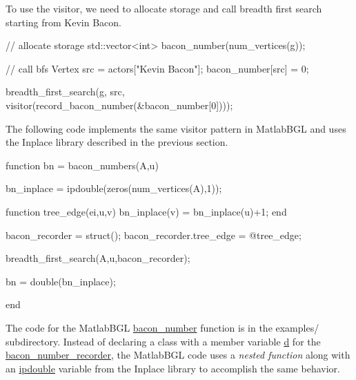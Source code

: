 \documentclass[12pt]{article}
\newcommand{\mycmd}[1]{\url{#1}}
\newcommand{\mypath}[1]{{\ttfamily \small #1}}
\begin{document}
To use the visitor, we need to allocate storage and call breadth first search starting from Kevin Bacon.

\begin{mcode}  
  // allocate storage
  std::vector<int> bacon_number(num_vertices(g));
  
  // call bfs
  Vertex src = actors["Kevin Bacon"];
  bacon_number[src] = 0;

  breadth_first_search(g, src, visitor(record_bacon_number(&bacon_number[0])));
\end{mcode}  

The following code implements the same visitor pattern in MatlabBGL and uses the Inplace library described in the previous section.

\begin{mcode}
function bn = bacon_numbers(A,u)
%

bn_inplace = ipdouble(zeros(num_vertices(A),1));

function tree_edge(ei,u,v)
    bn_inplace(v) = bn_inplace(u)+1;
end

bacon_recorder = struct();
bacon_recorder.tree_edge = @tree_edge;

breadth_first_search(A,u,bacon_recorder);

bn = double(bn_inplace);

end
\end{mcode}
The code for the MatlabBGL \mycmd{bacon_number} function is in the \mypath{examples/} subdirectory.  Instead of declaring a class with a member variable \mycmd{d} for the \mycmd{bacon_number_recorder}, the MatlabBGL code uses a \emph{nested function} along with an \mycmd{ipdouble} variable from the Inplace library to accomplish the same behavior.  
\end{document}

